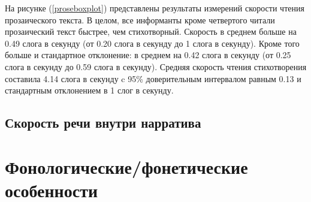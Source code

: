 \par На рисунке (\ref{proseboxplot}) представлены результаты измерений скорости чтения прозаического текста. В целом, все информанты кроме четвертого читали прозаический текст быстрее, чем стихотворный. Скорость в среднем больше на 0.49 слога в секунду (от 0.20 слога в секунду до 1 слога в секунду). Кроме того больше и стандартное отклонение: в среднем на 0.42 слога в секунду (от 0.25 слога в секунду до 0.59 слога в секунду). Средняя скорость чтения стихотворения составила 4.14 слога в секунду c 95\% доверительным интервалом равным 0.13 и стандартным отклонением в 1 слог в секунду.
\subsection{Скорость речи внутри нарратива}
\pagebreak
\section{Фонологические/фонетические особенности}
